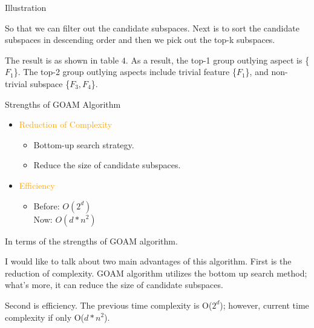 \documentclass[
size=14pt,
paper=smartboard,  %
mode=present, 		%
display=slides, 	%
style=tuliplab,  	%
pauseslide,
fleqn,leqno]{powerdot}
\begin{document}
\begin{slide}[toc=,bm=]{Illustration}
\begin{note}
		So that we can filter out the candidate subspaces.
		Next is to sort the candidate subspaces in
		descending order and then we pick out the top-k subspaces.
		
		The result is as shown in table $4$.
		As a result,
		the top-1 group outlying aspect is \{$F_1$\}.
		The top-2 group outlying aspects include
		trivial feature \{$F_1$\},
		and non-trivial subspace \{$F_3, F_4$\}.
	\end{note}
	
\end{slide}


\begin{slide}[toc=,bm=]{Strengths of GOAM Algorithm}
	\begin{itemize}
		\item
		\textcolor{orange}{Reduction of Complexity}
		
		\begin{itemize}
			\item
			Bottom-up search strategy.
			
			\item
			Reduce the size of candidate subspaces.
			
		\end{itemize}
		
		\item
		\textcolor{orange}{Efficiency}
		
		\begin{itemize}
			\item
			Before: $O(2^d)$  \\
			Now:    $O(d*n^{2})$
			
		\end{itemize}
	\end{itemize}
	
	\begin{note}
		In terms of the strengths of GOAM algorithm.
		
		I would like to talk about two main advantages of this algorithm.
		First is the reduction of complexity.
		GOAM algorithm utilizes the bottom up search method;
		what's more,
		it can reduce the size of candidate subspaces.
		
		Second is efficiency.
		The previous time complexity is O($2^d$);
		however,
		current time complexity if only O($d*n^2$).
	\end{note}
	
\end{slide}
\end{document}
